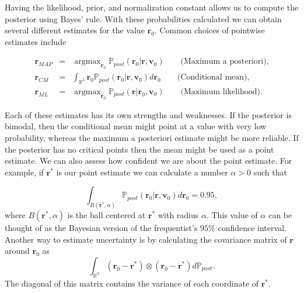 \documentclass{sfuthesis}
\newcommand{\post}{\mathbb{P}_{post}}
\newcommand{\argmax}{\mathop{\mathrm{argmax}}}
\begin{document}
Having the likelihood, prior, and normalization constant allows us to compute the posterior using
Bayes' rule. With these probabilities calculated 
we can obtain  several different estimates for the value $\textbf{r}_{0}$.  
Common choices of pointwise estimates include

%
%
\begin{eqnarray}\label{eqnpointestimates}
\textbf{r}_{MAP}&=&\argmax_{\textbf{r}_{0}}\post(\textbf{r}_{0}|\textbf{r},\textbf{v}_{0}) 
\qquad\text{(Maximum a posteriori),}\\
\textbf{r}_{CM}&=&\int_{\mathbb{R}^{3}}\textbf{r}_{0}\post(\textbf{r}_{0}|\textbf{r},\textbf{v}_{0})d\textbf{r}_{0}
\qquad\text{(Conditional mean)}, \\
\textbf{r}_{ML}&=&\argmax_{\textbf{r}_{0}}\post(\textbf{r}|\textbf{r}_{0},\textbf{v}_{0})
\qquad\text{(Maximum likelihood).}
\end{eqnarray} 

Each  of these estimates has its own strengths and weaknesses. If the posterior is bimodal, then the conditional
mean might point at a value with very low probability, whereas the maximum a posteriori estimate might be more 
reliable. If the posterior has no critical points then the mean might be used as a point estimate. We can 
also assess how confident we are about the point estimate. For example, if $\textbf{r}^{*}$ is our point
estimate we can calculate a number $\alpha>0$ such that

\begin{equation}\label{eqnBayesConf}
\int_{B(\textbf{r}^{*},\alpha)}\post(\textbf{r}_{0}|\textbf{r},\textbf{v}_{0})d\textbf{r}_{0}=0.95,
\end{equation}
where $B(\textbf{r}^{*},\alpha)$ is the ball centered at $\textbf{r}^{*}$ with radius $\alpha$. This 
value of $\alpha$ can be thought of as  the Bayesian version 
of the frequentist's $95\%$ confidence interval.
Another way to estimate uncertainty is by calculating the covariance matrix of $\textbf{r}$
around $\textbf{r}_{0}$ as
\begin{equation*}
\int_{\mathbb{R}^{3}}(\textbf{r}_{0}-\textbf{r}^{*})\otimes(\textbf{r}_{0}-\textbf{r}^{*})d\post.
\end{equation*}
\newline
The diagonal of this matrix  contains the variance of each coordinate of $\textbf{r}^{*}$.
\end{document}
